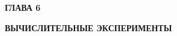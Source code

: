 \newpage
\begin{center}
	\textbf{\large ГЛАВА 6}

	\textbf{\large ВЫЧИСЛИТЕЛЬНЫЕ ЭКСПЕРИМЕНТЫ}
\end{center}
